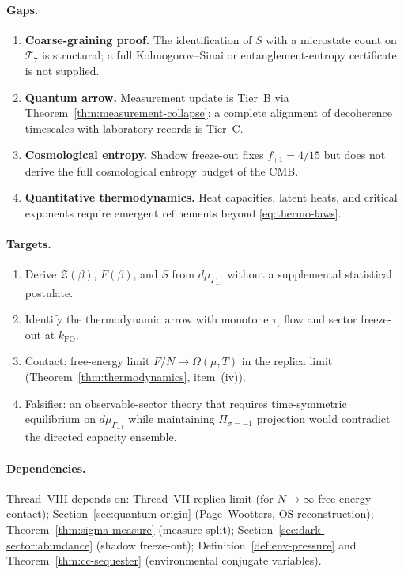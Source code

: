 \paragraph{Gaps.}
\begin{enumerate}[label=(\roman*),leftmargin=*]
  \item \textbf{Coarse-graining proof.} The identification of $S$ with a
    microstate count on $\mathcal{T}_7$ is structural; a full Kolmogorov--Sinai
    or entanglement-entropy certificate is not supplied.
  \item \textbf{Quantum arrow.} Measurement update is Tier~B via
    Theorem~\ref{thm:measurement-collapse}; a complete alignment of
    decoherence timescales with laboratory records is Tier~C.
  \item \textbf{Cosmological entropy.} Shadow freeze-out fixes $f_{+1}=4/15$
    but does not derive the full cosmological entropy budget of the CMB.
  \item \textbf{Quantitative thermodynamics.} Heat capacities, latent heats,
    and critical exponents require emergent refinements beyond
    \eqref{eq:thermo-laws}.
\end{enumerate}

\paragraph{Targets.}
\begin{enumerate}[label=(\roman*),leftmargin=*]
  \item Derive $\mathcal{Z}(\beta)$, $F(\beta)$, and $S$ from $d\mu_{\Gamma_{-1}}$
    without a supplemental statistical postulate.
  \item Identify the thermodynamic arrow with monotone $\tau_\iota$ flow and
    sector freeze-out at $k_{\mathrm{FO}}$.
  \item Contact: free-energy limit $F/N\to\Omega(\mu,T)$ in the replica limit
    (Theorem~\ref{thm:thermodynamics}, item~(iv)).
  \item Falsifier: an observable-sector theory that requires time-symmetric
    equilibrium on $d\mu_{\Gamma_{-1}}$ while maintaining
    $\Pi_{\sigma=-1}$ projection would contradict the directed capacity
    ensemble.
\end{enumerate}

\paragraph{Dependencies.}
Thread~VIII depends on:
Thread~VII replica limit (for $N\to\infty$ free-energy contact);
Section~\ref{sec:quantum-origin} (Page--Wootters, OS reconstruction);
Theorem~\ref{thm:sigma-measure} (measure split);
Section~\ref{sec:dark-sector:abundance} (shadow freeze-out);
Definition~\ref{def:env-pressure} and Theorem~\ref{thm:cc-sequester}
(environmental conjugate variables).

